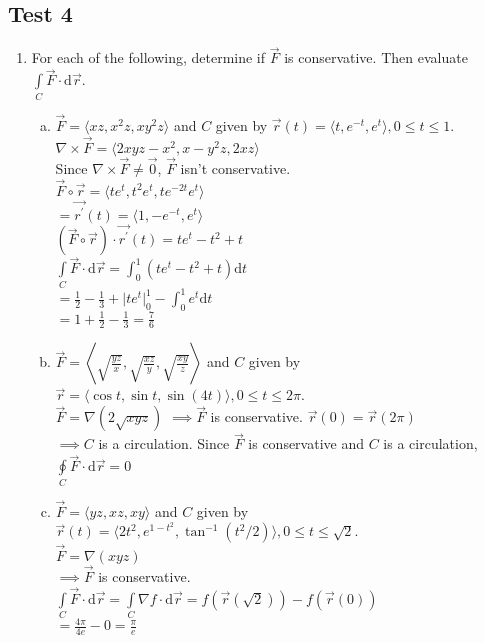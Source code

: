 \subsection{Test 4}
\begin{enumerate}
	\item For each of the following, determine if $\vec{F}$ is conservative. Then evaluate $\int\limits_{C}{\vec{F}\cdot\mathrm{d}\vec{r}}$.
	\begin{enumerate}[a.]
		\item $\vec{F}=\langle xz, x^2z, xy^2z\rangle$ and $C$ given by $\vec{r}(t)=\langle t,e^{-t},e^t\rangle, 0\leq t\leq 1$.\\
		$\nabla\times\vec{F}=\langle 2xyz-x^2,x-y^2z,2xz\rangle$\\
		Since $\nabla\times\vec{F}\neq\vec{0}$, $\vec{F}$ isn't conservative.\\
		$\vec{F}\circ\vec{r}=\langle te^t, t^2e^t,te^{-2t}e^t\rangle$\\
		$=\vec{r^\prime}(t)=\langle 1,-e^{-t},e^t\rangle$\\
		$\left(\vec{F}\circ\vec{r}\right)\cdot\vec{r^\prime}(t)=te^t-t^2+t$\\
		$\int\limits_{C}{\vec{F}\cdot\mathrm{d}\vec{r}}=\int_{0}^{1}{\left(te^t-t^2+t\right)\mathrm{d}t}$\\
		$=\frac{1}{2}-\frac{1}{3}+\lvert te^t\rvert_{0}^{1}-\int_{0}^{1}{e^t\mathrm{d}t}$\\
		$=1+\frac{1}{2}-\frac{1}{3}=\frac{7}{6}$\\
		
		\item $\vec{F}=\left<\sqrt{\frac{yz}{x}},\sqrt{\frac{xz}{y}},\sqrt{\frac{xy}{z}}\right>$ and $C$ given by $\vec{r}=\langle\cos{t},\sin{t},\sin{(4t)}\rangle, 0\leq t\leq 2\pi$.\\
		\indent
		$\vec{F}=\nabla(2\sqrt{xyz})$
		$\implies\vec{F}$ is conservative.
		$\vec{r}(0)=\vec{r}(2\pi)$\\
		$\implies C$ is a circulation.
		Since $\vec{F}$ is conservative and $C$ is a circulation, $\oint\limits_{C}{\vec{F}\cdot\mathrm{d}\vec{r}}=0$\\
		
		\item $\vec{F}=\langle yz, xz, xy\rangle$ and $C$ given by $\vec{r}(t)=\langle 2t^2, e^{1-t^2}, \tan^{-1}{(t^2/2)}\rangle, 0\leq t\leq\sqrt{2}$.\\
		$\vec{F}=\nabla(xyz)$\\
		$\implies\vec{F}$ is conservative.\\
		$\int\limits_{C}{\vec{F}\cdot\mathrm{d}\vec{r}}=\int\limits_{C}{\nabla f\cdot\mathrm{d}\vec{r}}=f(\vec{r}(\sqrt{2}))-f(\vec{r}(0))$\\
		$=\frac{4\pi}{4e}-0=\frac{\pi}{e}$\\
	\end{enumerate}
	

\end{enumerate}
